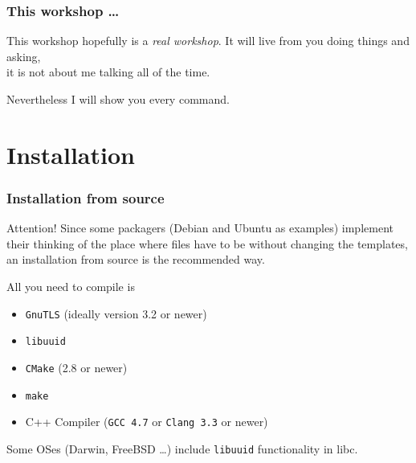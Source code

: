 \documentclass[t,handout]{beamer}
\begin{document}
\begin{frame}[fragile]\frametitle{This workshop \ldots}
    \vfill

    \begin{alertblock}{This workshop hopefully is a \textit{real workshop}.}
        It will live from you doing things and asking, \\
        it is not about me talking all of the time.
    \end{alertblock}

    {\tiny Nevertheless I will show you every command.}
\end{frame}

\section{Installation}

\begin{frame}[fragile]\frametitle{Installation from source}

    \begin{alertblock}{Attention!}
        Since some packagers (Debian and Ubuntu as examples) implement their thinking of the place where files have to be without changing the templates, an installation from source is the recommended way.
    \end{alertblock}
    \pause

    All you need to compile is
    \begin{itemize}
        \item \verb+GnuTLS+ (ideally version 3.2 or newer)
        \item \verb+libuuid+
        \item \verb+CMake+ (2.8 or newer)
        \item \verb+make+
        \item C++ Compiler (\verb+GCC 4.7+ or \verb+Clang 3.3+ or newer)
    \end{itemize}

    Some OSes (Darwin, FreeBSD \ldots) include \verb+libuuid+ functionality in libc.
\end{frame}
\end{document}
